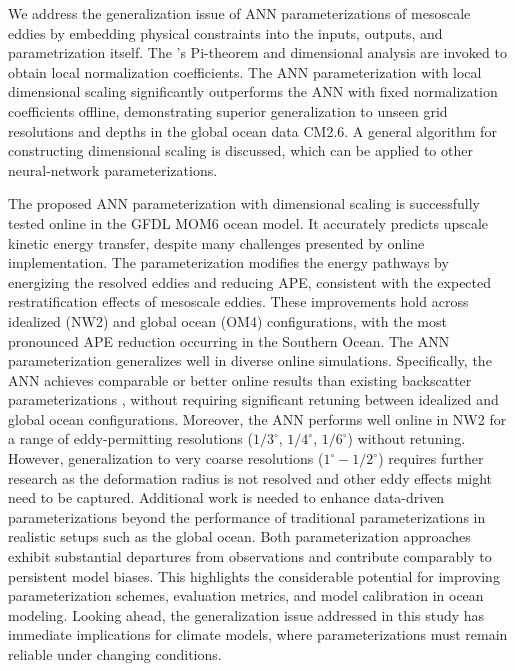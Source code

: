 \documentclass[draft]{agujournal2019}
\begin{document}
We address the generalization issue of  ANN parameterizations of mesoscale eddies by embedding physical constraints into the inputs, outputs, and parametrization itself. The 's Pi-theorem and dimensional analysis are invoked to obtain local normalization coefficients. The ANN parameterization with local dimensional scaling significantly outperforms the ANN with fixed normalization coefficients offline, demonstrating superior generalization to unseen grid resolutions and depths in the global ocean data CM2.6. A general algorithm for constructing dimensional scaling is discussed, which can be applied to other neural-network parameterizations.

The proposed ANN parameterization with dimensional scaling is successfully tested online in the GFDL MOM6 ocean model. It accurately predicts upscale kinetic energy transfer, despite many challenges presented by online implementation. The parameterization modifies the energy pathways by energizing the resolved eddies and reducing APE, consistent with the expected restratification effects of mesoscale eddies. These improvements hold across idealized (NW2) and global ocean (OM4) configurations, with the most pronounced APE reduction occurring in the Southern Ocean. The ANN parameterization generalizes well in diverse online simulations. Specifically, the ANN achieves comparable or better online results than existing backscatter parameterizations \cite{chang2023remote, yankovsky2024, perezhogin2024stable}, without requiring significant retuning between idealized and global ocean configurations. Moreover, the ANN performs well online in NW2 for a range of eddy-permitting resolutions ($1/3^\circ$, $1/4^\circ$, $1/6^\circ$) without retuning. %
However, generalization to very coarse resolutions ($1^\circ-1/2^\circ$) requires further research as the deformation radius is not resolved and other eddy effects might need to be captured. Additional work is needed to enhance data-driven parameterizations beyond the performance of traditional parameterizations in realistic setups such as the global ocean. Both parameterization approaches exhibit substantial departures from observations and contribute comparably to persistent model biases. This highlights the considerable potential for improving parameterization schemes, evaluation metrics, and model calibration in ocean modeling. Looking ahead, the generalization issue addressed in this study has immediate implications for climate models, where parameterizations must remain reliable under changing conditions.
\end{document}
